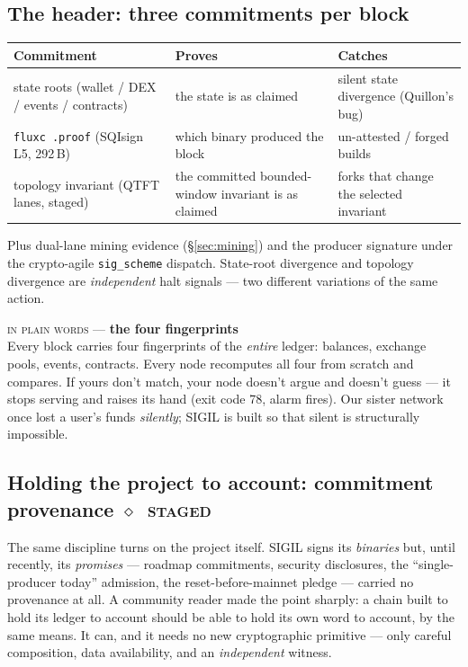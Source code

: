 \documentclass[10pt,a4paper]{article}
\newcommand{\stG}{\textcolor{sigilviolet}{$\diamond$}~{\scriptsize\textcolor{sigilviolet}{\textsc{staged}}}}
\newcommand{\layman}[3]{%
\begin{tcolorbox}[enhanced,
  interior style={left color=#1!9,right color=white},
  colframe=#1!45!slate,boxrule=0.5pt,arc=3pt,
  borderline west={2.5pt}{0pt}{#1},
  left=9pt,right=9pt,top=7pt,bottom=7pt]
{\scriptsize\textcolor{#1}{\textsc{in plain words}}\; — \;\textbf{\small #2}}\\[3pt]
\small #3
\end{tcolorbox}}
\begin{document}
\subsection{The header: three commitments per block}

\begin{center}
\small
{}
\renewcommand{\arraystretch}{1.4}
\begin{tabularx}{\textwidth}{@{}>{\RaggedRight\arraybackslash}p{4.9cm}>{\RaggedRight\arraybackslash}X>{\RaggedRight\arraybackslash}p{4.3cm}@{}}
\toprule
Commitment & Proves & Catches \\
\midrule
4 state roots (wallet / DEX / events / contracts) & the state is as claimed &
silent state divergence (Quillon's bug) \\
\texttt{fluxc .proof} (SQIsign L5, 292\,B) & which binary produced the block &
un-attested / forged builds \\
topology invariant (QTFT lanes, \textcolor{sigilviolet}{staged}) & the committed
bounded-window invariant is as claimed & forks that change the selected invariant \\
\bottomrule
\end{tabularx}
\end{center}

Plus dual-lane mining evidence (\S\ref{sec:mining}) and the producer signature under
the crypto-agile \texttt{sig\_scheme} dispatch. State-root divergence and topology
divergence are \emph{independent} halt signals — two different variations of the same
action.

\layman{sigilcyan}{the four fingerprints}{Every block carries four fingerprints of the
\emph{entire} ledger: balances, exchange pools, events, contracts. Every node
recomputes all four from scratch and compares. If yours don't match, your node doesn't
argue and doesn't guess — it stops serving and raises its hand (exit code 78, alarm
fires). Our sister network once lost a user's funds \emph{silently}; SIGIL is built so
that silent is structurally impossible.}

\subsection{Holding the project to account: commitment provenance \hfill \stG}

The same discipline turns on the project itself. SIGIL signs its \emph{binaries} but,
until recently, its \emph{promises} --- roadmap commitments, security disclosures, the
``single-producer today'' admission, the reset-before-mainnet pledge --- carried no
provenance at all. A community reader made the point sharply: a chain built to hold its
ledger to account should be able to hold its own word to account, by the same means. It
can, and it needs no new cryptographic primitive --- only careful composition, data
availability, and an \emph{independent} witness.
\end{document}
